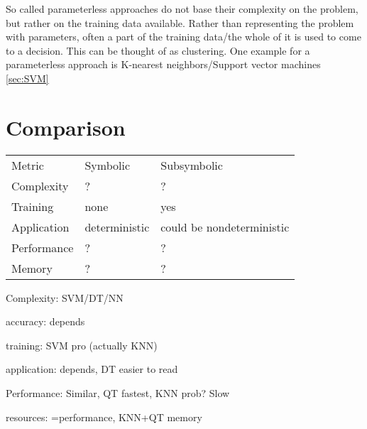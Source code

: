 So called parameterless approaches do not base their complexity on the problem, but rather on the training data available. Rather than representing the problem with parameters, often a part of the training data/the whole of it is used to come to a decision. This can be thought of as clustering.
One example for a parameterless approach is K-nearest neighbors/Support vector machines \autoref{sec:SVM}

\section{Comparison}
\begin{tabular}{l p{5cm} p{5cm}}
    Metric      & Symbolic  & Subsymbolic\\
    Complexity  & ? & ? \\
    Training    & none & yes \\
    Application & deterministic&could be nondeterministic\\
    Performance & ? & ? \\
    Memory      & ? & ? \\
\end{tabular}

Complexity: SVM/DT/NN

accuracy: depends

training: SVM pro (actually KNN)

application: depends, DT easier to read

Performance: Similar, QT fastest, KNN prob? Slow

resources: =performance, KNN+QT memory
